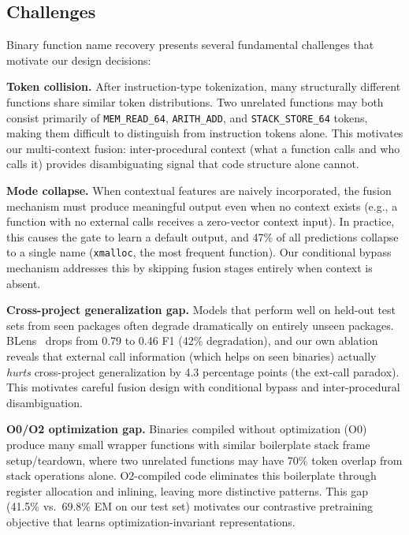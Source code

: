 \documentclass[sigconf,nonacm]{acmart}
\begin{document}
\subsection{Challenges}
\label{sec:challenges}

Binary function name recovery presents several fundamental challenges that motivate our design decisions:

\textbf{Token collision.} After instruction-type tokenization, many structurally different functions share similar token distributions. Two unrelated functions may both consist primarily of \texttt{MEM\_READ\_64}, \texttt{ARITH\_ADD}, and \texttt{STACK\_STORE\_64} tokens, making them difficult to distinguish from instruction tokens alone. This motivates our multi-context fusion: inter-procedural context (what a function calls and who calls it) provides disambiguating signal that code structure alone cannot.

\textbf{Mode collapse.} When contextual features are naively incorporated, the fusion mechanism must produce meaningful output even when no context exists (e.g., a function with no external calls receives a zero-vector context input). In practice, this causes the gate to learn a default output, and 47\% of all predictions collapse to a single name (\texttt{xmalloc}, the most frequent function). Our conditional bypass mechanism addresses this by skipping fusion stages entirely when context is absent.

\textbf{Cross-project generalization gap.} Models that perform well on held-out test sets from seen packages often degrade dramatically on entirely unseen packages. BLens~\cite{blens} drops from 0.79 to 0.46 F1 (42\% degradation), and our own ablation reveals that external call information (which helps on seen binaries) actually \emph{hurts} cross-project generalization by 4.3 percentage points (the ext-call paradox). This motivates careful fusion design with conditional bypass and inter-procedural disambiguation.

\textbf{O0/O2 optimization gap.} Binaries compiled without optimization (O0) produce many small wrapper functions with similar boilerplate stack frame setup/teardown, where two unrelated functions may have 70\% token overlap from stack operations alone. O2-compiled code eliminates this boilerplate through register allocation and inlining, leaving more distinctive patterns. This gap (41.5\% vs.\ 69.8\% EM on our test set) motivates our contrastive pretraining objective that learns optimization-invariant representations.
\end{document}
